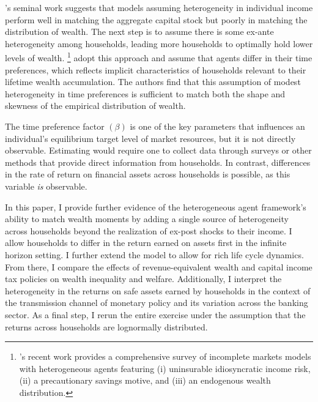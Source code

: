 \par  \cite{ks1998}'s seminal work suggests that models assuming heterogeneity in individual income perform well in matching the aggregate capital stock but poorly in matching the distribution of wealth. The next step is to assume there is some ex-ante heterogeneity among households, leading more households to optimally hold lower levels of wealth. \footnote{ \cite{gkgv22}'s  recent work provides a comprehensive survey of incomplete markets models with heterogeneous agents featuring (i) uninsurable idiosyncratic income risk, (ii) a precautionary savings motive, and (iii) an endogenous wealth distribution.}  \cite{cstw2017} adopt this approach and assume that agents differ in their time preferences, which reflects implicit characteristics of households relevant to their lifetime wealth accumulation. The authors find that this assumption of modest heterogeneity in time preferences is sufficient to match both the shape and skewness of the empirical distribution of wealth.

\par The time preference factor $(\beta)$ is one of the key parameters that influences an individual's equilibrium target level of market resources, but it is not directly observable. Estimating would require one to collect data through surveys or other methods that provide direct information from households. In contrast, differences in the rate of return on financial assets across households is possible, as this variable \textit{is} observable. 

\par In this paper, I provide further evidence of the heterogeneous agent framework's ability to match wealth moments by adding a single source of heterogeneity across households beyond the realization of ex-post shocks to their income. I allow households to differ in the return earned on assets first in the infinite horizon setting. I further extend the model to allow for rich life cycle dynamics. From there, I compare the effects of revenue-equivalent wealth and capital income tax policies on wealth inequality and welfare. Additionally, I interpret the heterogeneity in the returns on safe assets earned by households in the context of the transmission channel of monetary policy and its variation across the banking sector. As a final step, I rerun the entire exercise under the assumption that the returns across households are lognormally distributed.
